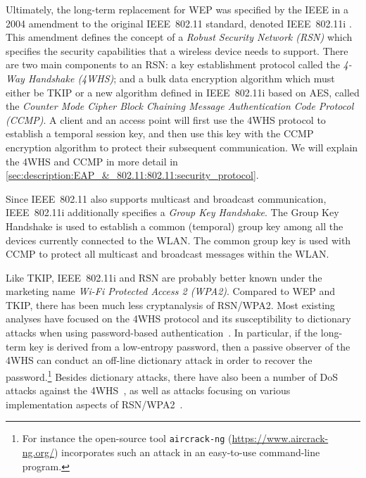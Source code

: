 Ultimately,
the long-term replacement for WEP was specified by the IEEE in a 2004 amendment to the original IEEE~802.11 standard,
denoted IEEE~802.11i \cite{IEEE:2004:802.11i}.
This amendment defines the concept of a \emph{Robust Security Network (RSN)}
which specifies the security capabilities that a wireless device needs to support.
There are two main components to an RSN: 
a key establishment protocol called the \emph{4-Way Handshake (4WHS)};
and a bulk data encryption algorithm which must either be TKIP or a new algorithm defined in IEEE~802.11i based on AES,
called the  \emph{Counter Mode Cipher Block Chaining Message Authentication Code Protocol (CCMP)}.
A client and an access point will first use the 4WHS protocol to establish a temporal session key,
and then use this key with the CCMP encryption algorithm to protect their subsequent communication.
We will explain the 4WHS and CCMP in more detail in \cref{sec:description:EAP_&_802.11:802.11:security_protocol}.




Since IEEE~802.11 also supports multicast and broadcast communication,
IEEE~802.11i additionally specifies a \emph{Group Key Handshake}.
The Group Key Handshake is used to establish a common (temporal) group key among all the devices currently connected  to the WLAN.
The common group key is used with CCMP to protect all multicast and broadcast messages within the WLAN.

Like TKIP,
IEEE~802.11i and RSN are probably better known under the marketing name
\emph{Wi-Fi Protected Access 2 (WPA2)}.
Compared to WEP and TKIP,
there has been much less cryptanalysis of RSN/WPA2.
Most existing analyses have focused on the 4WHS protocol and its susceptibility to dictionary attacks when using password-based authentication~\cite{JohnsonRJZ:2015:WPA/WPA2_FGPA_brute_force,CHES:KMBKK16}.
In particular,
if the long-term key is derived from a low-entropy password,
then a passive observer of the 4WHS can conduct an off-line dictionary attack in order to recover the password.\footnote{For instance the 
open-source tool \texttt{aircrack-ng} (\url{https://www.aircrack-ng.org/}) incorporates such an attack in an easy-to-use command-line program. 
} 
Besides dictionary attacks,
there have also been a number of DoS attacks against the 4WHS~\cite{HeM:2004:analysis_4WHS,NDSS:HeMit05,RangoLM:2006:DoS_802.11,ACNS:Eian09,CANS:Eian10,EianM:2012:802.11_deadlock},
as well as attacks focusing on various implementation aspects of RSN/WPA2~\cite{NDSS:CRKN13,VanhoefP:2016:WPA2_GTK_attack}.

